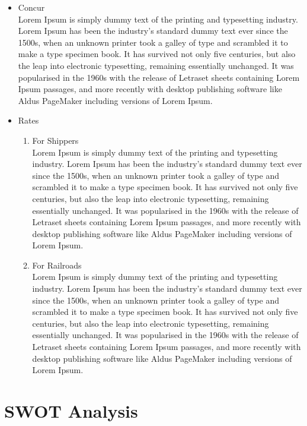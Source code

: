 \documentclass[12pt,a4paper]{report}
\begin{document}
\begin{itemize}
\item Concur \\
Lorem Ipsum is simply dummy text of the printing and typesetting industry. Lorem Ipsum has been the industry's standard dummy text ever since the 1500s, when an unknown printer took a galley of type and scrambled it to make a type specimen book. It has survived not only five centuries, but also the leap into electronic typesetting, remaining essentially unchanged. It was popularised in the 1960s with the release of Letraset sheets containing Lorem Ipsum passages, and more recently with desktop publishing software like Aldus PageMaker including versions of Lorem Ipsum.

\item Rates
\begin{enumerate}
\item For Shippers\\
Lorem Ipsum is simply dummy text of the printing and typesetting industry. Lorem Ipsum has been the industry's standard dummy text ever since the 1500s, when an unknown printer took a galley of type and scrambled it to make a type specimen book. It has survived not only five centuries, but also the leap into electronic typesetting, remaining essentially unchanged. It was popularised in the 1960s with the release of Letraset sheets containing Lorem Ipsum passages, and more recently with desktop publishing software like Aldus PageMaker including versions of Lorem Ipsum.

\item For Railroads\\
Lorem Ipsum is simply dummy text of the printing and typesetting industry. Lorem Ipsum has been the industry's standard dummy text ever since the 1500s, when an unknown printer took a galley of type and scrambled it to make a type specimen book. It has survived not only five centuries, but also the leap into electronic typesetting, remaining essentially unchanged. It was popularised in the 1960s with the release of Letraset sheets containing Lorem Ipsum passages, and more recently with desktop publishing software like Aldus PageMaker including versions of Lorem Ipsum.
\end{enumerate}


\end{itemize}

\section{SWOT Analysis}
\end{document}
